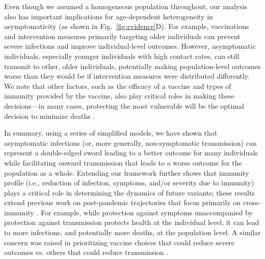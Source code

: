 \documentclass[12pt]{article}
\newcommand{\fref}[1]{Fig.~\ref{fig:#1}}
\begin{document}
Even though we assumed a homogeneous population throughout, our analysis also has important implications for age-dependent heterogeneity in asymptomaticity (as shown in \fref{evidence}D).
For example, vaccinations and intervention measures primarily targeting older individuals can prevent severe infections and improve individual-level outcomes.
However, asymptomatic individuals, especially younger individuals with high contact rates, can still transmit to other, older individuals, potentially making population-level outcomes worse than they would be if intervention measures were distributed differently.
We note that other factors, such as the efficacy of a vaccine and types of immunity provided by the vaccine, also play critical roles in making these decisions---in many cases, protecting the most vulnerable will be the optimal decision to minimize deaths \citep{moore2021modelling}.

In summary, using a series of simplified models, we have shown that asymptomatic infections (or, more generally, non-symptomatic transmission) can represent a double-edged sword leading to a better outcome for many individuals while facilitating onward transmission that leads to a worse outcome for the population as a whole.
Extending our framework further shows that immunity profile (i.e., reduction of infection, symptoms, and/or severity due to immunity) plays a critical role in determining the dynamics of future variants;
these results extend previous work on post-pandemic trajectories that focus primarily on cross-immunity \citep{kissler2020projecting,lavine2021immunological}.
For example, while protection against symptoms unaccompanied by protection against transmission protects health at the individual level, it can lead to more infections, and potentially more deaths, at the population level.
A similar concern was raised in prioritizing vaccine choices that could reduce severe outcomes vs. others that could reduce transmission \citep{koelle2022changing}.
\end{document}
